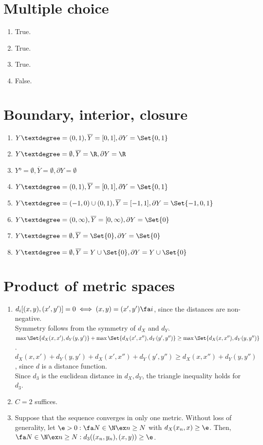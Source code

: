 \documentclass{article}
\begin{document}
\section{Multiple choice}
\begin{enumerate}
    \item True.  
    \item True.  
    \item True. 
    \item False. 
\end{enumerate}

\section{Boundary, interior, closure}
\begin{enumerate}
    \item $Y° = (0, 1), \overline{Y} = [0, 1], \partial Y = \Set{0, 1}$
    \item $Y° = \emptyset, \overline{Y} = \R, \partial Y = \R$
    \item $Y° = \emptyset, \overline{Y} = \emptyset, \partial Y = \emptyset$
    \item $Y° = (0, 1), \overline{Y} = [0, 1], \partial Y = \Set{0, 1}$
    \item $Y° = (-1, 0) \cup (0, 1), \overline{Y} = [-1, 1], \partial Y = \Set{-1, 0, 1}$
    \item $Y° = (0, \infty), \overline{Y} = [0, \infty), \partial Y = \Set{0}$
    \item $Y° = \emptyset, \overline{Y} = \Set{0}, \partial Y = \Set{0}$
    \item $Y° = \emptyset, \overline{Y} = Y \cup \Set{0}, \partial Y = Y \cup \Set{0}$
\end{enumerate}

\section{Product of metric spaces}
\begin{enumerate}
    \item $d_i[(x, y), (x', y')] = 0 \iff (x, y) = (x', y') \fa i$, since the distances are non-negative. \\
    Symmetry follows from the symmetry of $d_X$ and $d_Y$. \\
    $\max \Set{d_X(x, x'), d_Y(y, y')} + \max \Set{d_X(x', x''), d_Y(y', y'')} \geq \max \Set{d_X(x, x''), d_Y(y, y'')}$. \\
    $d_X(x, x') + d_Y(y, y') + d_X(x', x'') + d_Y(y', y'') \geq d_X(x, x'') + d_Y(y, y'')$, since $d$ is a distance function. \\
    Since $d_3$ is the euclidean distance in $d_X, d_Y$, the triangle inequality holds for $d_3$.

    \item $C = 2$ suffices.  
    
    \item Suppose that the sequence converges in only one metric. 
    Without loss of generality, let $\e > 0: \fa N \in \N \ex n \geq N $ with $d_X(x_n, x) \geq \e$. 
    Then, $\fa N \in \N \ex n \geq N: d_3((x_n, y_n), (x, y)) \geq \e$.
\end{enumerate}
\end{document}
